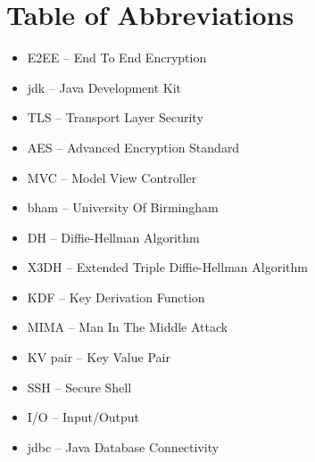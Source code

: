 \section*{Table of Abbreviations}
\begin{itemize}[nolistsep]
\item E2EE -- End To End Encryption
\item jdk -- Java Development Kit
\item TLS -- Transport Layer Security
\item AES -- Advanced Encryption Standard
\item MVC -- Model View Controller
\item bham -- University Of Birmingham
\item DH -- Diffie-Hellman Algorithm
\item X3DH -- Extended Triple Diffie-Hellman Algorithm
\item KDF -- Key Derivation Function
\item MIMA -- Man In The Middle Attack
\item KV pair -- Key Value Pair
\item SSH -- Secure Shell
\item I/O -- Input/Output
\item jdbc -- Java Database Connectivity
\end{itemize}